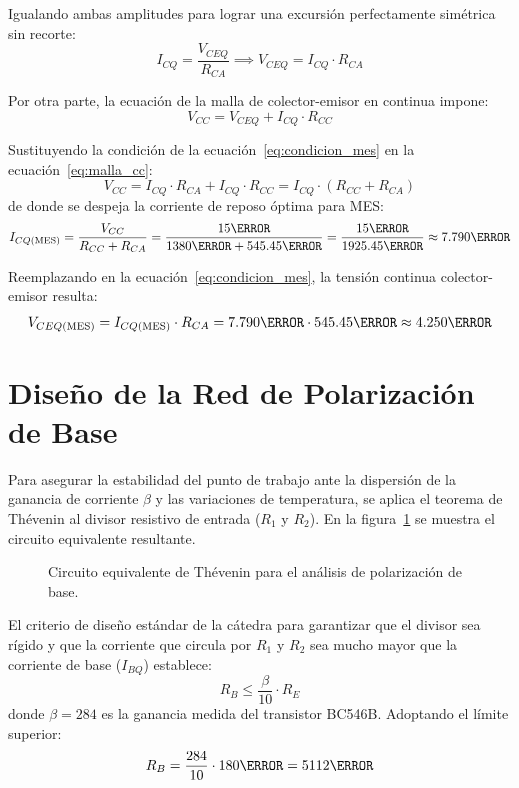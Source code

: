 Igualando ambas amplitudes para lograr una excursión perfectamente simétrica sin recorte:
\begin{equation}
  I_{CQ} = \frac{V_{CEQ}}{R_{CA}} \implies V_{CEQ} = I_{CQ} \cdot R_{CA}
  \label{eq:condicion_mes}
\end{equation}

Por otra parte, la ecuación de la malla de colector-emisor en continua impone:
\begin{equation}
  V_{CC} = V_{CEQ} + I_{CQ} \cdot R_{CC}
  \label{eq:malla_cc}
\end{equation}

Sustituyendo la condición de la ecuación~\eqref{eq:condicion_mes} en la ecuación~\eqref{eq:malla_cc}:
\begin{equation}
  V_{CC} = I_{CQ} \cdot R_{CA} + I_{CQ} \cdot R_{CC} = I_{CQ} \cdot (R_{CC} + R_{CA})
\end{equation}
de donde se despeja la corriente de reposo óptima para MES:
\begin{equation}
  I_{CQ(\text{MES})} = \frac{V_{CC}}{R_{CC} + R_{CA}} = \frac{15\V}{1380\ohm + 545.45\ohm} = \frac{15\V}{1925.45\ohm} \approx 7.790\mA
  \label{eq:Icq_mes}
\end{equation}

Reemplazando en la ecuación~\eqref{eq:condicion_mes}, la tensión continua colector-emisor resulta:
\begin{equation}
  V_{CEQ(\text{MES})} = I_{CQ(\text{MES})} \cdot R_{CA} = 7.790\mA \cdot 545.45\ohm \approx 4.250\V
  \label{eq:Vceq_mes}
\end{equation}

\section{Diseño de la Red de Polarización de Base}

Para asegurar la estabilidad del punto de trabajo ante la dispersión de la ganancia de corriente $\beta$ y las
variaciones de temperatura, se aplica el teorema de Thévenin al divisor resistivo de entrada ($R_1$ y $R_2$).
En la figura~\ref{crkt:thevenin} se muestra el circuito equivalente resultante.

\begin{figure}[!ht]
  \centering
  
  \caption{Circuito equivalente de Thévenin para el análisis de polarización de base.}
  \label{crkt:thevenin}
\end{figure}

El criterio de diseño estándar de la cátedra para garantizar que el divisor sea rígido y que la corriente que circula
por $R_1$ y $R_2$ sea mucho mayor que la corriente de base ($I_{BQ}$) establece:
\begin{equation}
  R_B \le \frac{\beta}{10} \cdot R_E
  \label{eq:criterio_rb}
\end{equation}
donde $\beta = 284$ es la ganancia medida del transistor BC546B. Adoptando el límite superior:
\begin{equation}
  R_B = \frac{284}{10} \cdot 180\ohm = 5112\ohm
  \label{eq:Rb_calculada}
\end{equation}

